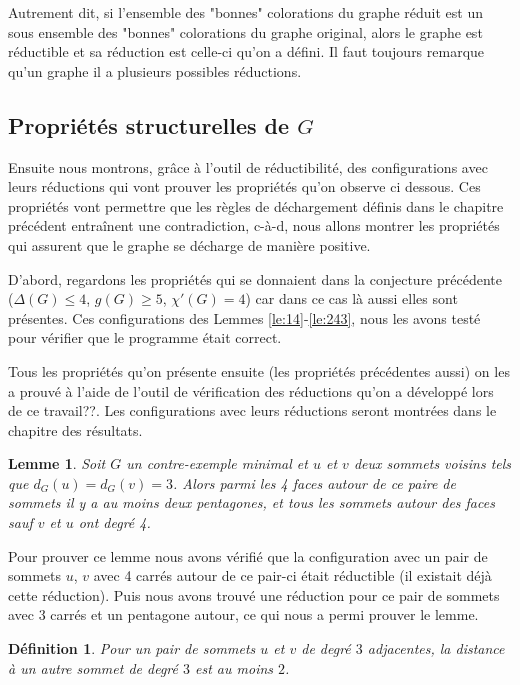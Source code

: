 \documentclass[10pt,a4paper]{article}
\newtheorem{definition}{Définition}
\newtheorem{lemme}{Lemme}
\begin{document}
Autrement dit, si l'ensemble des "bonnes" colorations du graphe réduit est un sous ensemble des "bonnes" colorations du graphe original, alors le graphe est réductible et sa réduction est celle-ci qu'on a défini. Il faut toujours remarque qu'un graphe il a plusieurs possibles réductions. 
\subsection{Propriétés structurelles de $G$}

Ensuite nous montrons, grâce à l'outil de réductibilité, des configurations avec leurs réductions qui vont prouver les propriétés qu'on observe ci dessous. Ces propriétés vont permettre que les règles de déchargement définis dans le chapitre précédent entraînent une contradiction, c-à-d, nous allons montrer les propriétés qui assurent que le graphe se décharge de manière positive.

D'abord, regardons les propriétés qui se donnaient dans la conjecture précédente ($\Delta(G) \leq 4$, $g(G) \geq 5$, $\chi'(G) =4$) car dans ce cas là aussi elles sont présentes. Ces configurations des Lemmes \ref{le:14}-\ref{le:243}, nous les avons testé pour vérifier que le programme était correct. 

Tous les propriétés qu'on présente ensuite (les propriétés précédentes aussi) on les a prouvé à l'aide de l'outil de vérification des réductions qu'on a développé lors de ce {\color{blue}travail??}. Les configurations avec leurs réductions seront montrées dans le chapitre des résultats.

\begin{lemme}
Soit $G$ un contre-exemple minimal et $u$ et $v$ deux sommets voisins tels que $d_G(u)=d_G(v) = 3$. Alors parmi les 4 faces autour de ce paire de sommets il y a au moins deux pentagones, et tous les sommets autour des faces sauf $v$ et $u$ ont degré 4.
\label{le:33pent}
\end{lemme}

Pour prouver ce lemme nous avons vérifié que la configuration avec un pair de sommets $u$, $v$ avec 4 carrés autour de ce pair-ci était réductible (il existait déjà cette réduction). Puis nous avons trouvé une réduction pour ce pair de sommets avec 3 carrés et un pentagone autour, ce qui nous a permi prouver le lemme.

\begin{definition}
Pour un pair de sommets $u$ et $v$ de degré $3$ adjacentes, la distance à un autre sommet de degré $3$ est au moins $2$.
\label{de:3343}
\end{definition}
\end{document}
